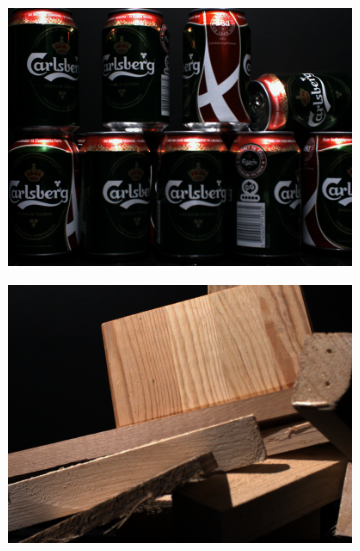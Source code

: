 \documentclass[thesis.tex]{subfiles}
\begin{document}
\begin{figure}[p]
	\centering
	\begin{subfigure}{0.49\textwidth}
		\includegraphics[width=\textwidth]{img/dtu_example_1.png}
	\end{subfigure}
	\hfill
	\begin{subfigure}{0.49\textwidth}
		\includegraphics[width=\textwidth]{img/dtu_example_2.png}
	\end{subfigure}
	\par\medskip
	\begin{subfigure}{0.49\textwidth}

\end{subfigure}
\end{figure}
\end{document}
